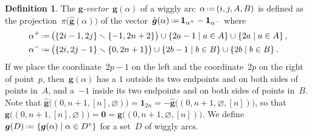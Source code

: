 \documentclass{amsart}
\theoremstyle{definition}
\newtheorem{definition}[theorem]{Definition}
\renewcommand{\b}[1]{{\boldsymbol{#1}}} %
\newcommand{\set}[2]{\left\{ #1 \;\middle|\; #2 \right\}} %
\newcommand{\ssm}{\smallsetminus} %
\newcommand{\one}{\b{1}} %
\newcommand{\eqdef}{\mbox{\,\raisebox{0.2ex}{\scriptsize\ensuremath{\mathrm:}}\ensuremath{=}\,}} %
\newcommand{\darkblue}{\color{darkblue}} %
\newcommand{\defn}[1]{\textsl{\darkblue #1}} %
\begin{document}
\begin{definition}
\label{def:gvectors}
The \defn{$\b{g}$-vector}~$\b{g}(\alpha)$ of a wiggly arc~$\alpha \eqdef (i, j, A, B)$ is defined as the projection~$\pi \big( \hat{\b{g}}(\alpha) \big)$ of the vector~$\hat{\b{g}}(\alpha) \eqdef \one_{\alpha^+} - \one_{\alpha^-}$ where
\begin{align*}
\alpha^+ & \eqdef \big(\{2i-1, 2j\} \ssm \{-1, 2n+2\} \big) \cup \set{2a-1}{a \in A} \cup \set{2a}{a \in A},
\\
\alpha^- & \eqdef \big(\{2i, 2j-1\} \ssm \{0, 2n+1\} \big) \cup \set{2b-1}{b \in B} \cup \set{2b}{b \in B}.
\end{align*}
If we place the coordinate~$2p-1$ on the left and the coordinate~$2p$ on the right of point~$p$, then~$\b{g}(\alpha)$ has a $1$ outside its two endpoints and on both sides of points in~$A$, and a~$-1$ inside its two endpoints and on both sides of points in~$B$.
Note that ${\hat{\b{g}} \big( (0, n+1, [n], \varnothing) \big) = \one_{2n} = - \hat{\b{g}} \big( (0, n+1, \varnothing, [n]) \big)}$, so that~${\b{g} \big( (0, n+1, [n], \varnothing) \big) = \b{0} = \b{g} \big( (0, n+1, \varnothing, [n]) \big)}$.
We define~$\b{g}(D) \eqdef \set{\b{g}(\alpha)}{\alpha \in D^\circ}$ for a set~$D$ of wiggly arcs.
\end{definition}
\end{document}
